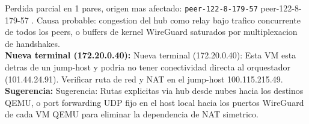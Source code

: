 \documentclass[11pt,a4paper]{article}
\begin{document}
Perdida parcial en 1 pares, origen mas afectado:  \texttt{peer-122-8-179-57} peer-122-8-179-57 . Causa probable: congestion del hub como relay bajo trafico concurrente de todos los peers, o buffers de kernel WireGuard saturados por multiplexacion de handshakes.\\

\textbf{Nueva terminal (172.20.0.40):} Nueva terminal (172.20.0.40):  Esta VM esta detras de un jump-host y podria no tener conectividad directa al orquestador (101.44.24.91). Verificar ruta de red y NAT en el jump-host 100.115.215.49.\\

\textbf{Sugerencia:} Sugerencia:  Rutas explicitas via hub desde nubes hacia los destinos QEMU, o port forwarding UDP fijo en el host local hacia los puertos WireGuard de cada VM QEMU para eliminar la dependencia de NAT simetrico.\\
\end{document}
